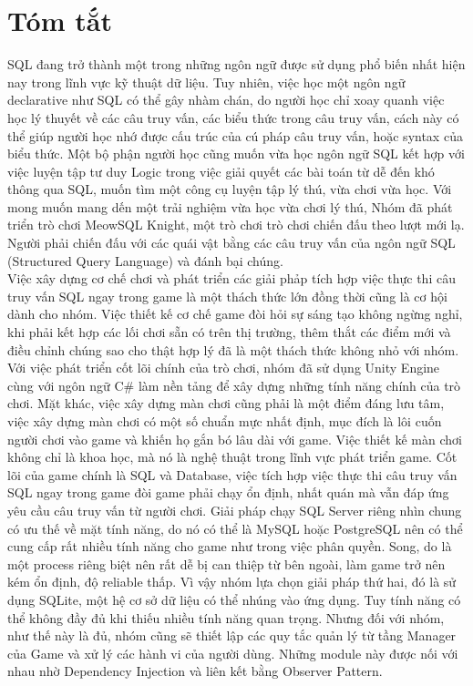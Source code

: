 \section*{Tóm tắt}
\thispagestyle{empty}

\hspace*{0.5cm} SQL đang trở thành một trong những ngôn ngữ được sử dụng phổ biến nhất hiện nay trong lĩnh vực kỹ thuật dữ liệu. Tuy nhiên, việc học một ngôn ngữ declarative như SQL có thể gây nhàm chán, do người học chỉ xoay quanh việc học lý thuyết về các câu truy vấn, các biểu thức trong câu truy vấn, cách này có thể giúp người học nhớ được cấu trúc của cú pháp câu truy vấn, hoặc syntax của biểu thức. Một bộ phận người học cũng muốn vừa học ngôn ngữ SQL kết hợp với việc luyện tập tư duy Logic trong việc giải quyết các bài toán từ dễ đến khó thông qua SQL, muốn tìm một công cụ luyện tập lý thú, vừa chơi vừa học. Với mong muốn mang dến một trải nghiệm vừa học vừa chơi lý thú, Nhóm đã phát triển trò chơi MeowSQL Knight, một trò chơi trò chơi chiến đấu theo lượt mới lạ. Người phải chiến đấu với các quái vật bằng các câu truy vấn của ngôn ngữ SQL (Structured Query Language) và đánh bại chúng. \\
\hspace*{0.5cm} Việc xây dựng cơ chế chơi và phát triển các giải phảp tích hợp việc thực thi câu truy vấn SQL ngay trong game là một thách thức lớn đồng thời cũng là cơ hội dành cho nhóm. Việc thiết kế cơ chế game đòi hỏi sự sáng tạo không ngừng nghỉ, khi phải kết hợp các lối chơi sẵn có trên thị trường, thêm thắt các điểm mới và điều chỉnh chúng sao cho thật hợp lý đã là một thách thức không nhỏ với nhóm. Với việc phát triển cốt lõi chính của trò chơi, nhóm đã sử dụng Unity Engine cùng với ngôn ngữ C\# làm nền tảng để xây dựng những tính năng chính của trò chơi.
\hspace*{0.5cm} Mặt khác, việc xây dựng màn chơi cũng phải là một điểm đáng lưu tâm, việc xây dựng màn chơi có một số chuẩn mực nhất định, mục đích là lôi cuốn người chơi vào game và khiến họ gắn bó lâu dài với game. Việc thiết kế màn chơi không chỉ là khoa học, mà nó là nghệ thuật trong lĩnh vực phát triển game.
\hspace*{1cm} Cốt lõi của game chính là SQL và Database, việc tích hợp việc thực thi câu truy vấn SQL ngay trong game đòi game phải chạy ổn định, nhất quán mà vẫn đáp ứng yêu cầu câu truy vấn từ người chơi. Giải pháp chạy SQL Server riêng nhìn chung có ưu thế về mặt tính năng, do nó có thể là MySQL hoặc PostgreSQL nên có thể cung cấp rất nhiều tính năng cho game như trong việc phân quyền. Song, do là một process riêng biệt nên rất dễ bị can thiệp từ bên ngoài, làm game trở nên kém ổn định, độ reliable thấp. Vì vậy nhóm lựa chọn giải pháp thứ hai, đó là sử dụng SQLite, một hệ cơ sở dữ liệu có thể nhúng vào ứng dụng. Tuy tính năng có thể không đầy đủ khi thiếu nhiều tính năng quan trọng. Nhưng đối với nhóm, như thế này là đủ, nhóm cũng sẽ thiết lập các quy tắc quản lý từ tầng Manager của Game và xử lý các hành vi của người dùng. Những module này được nối với nhau nhờ Dependency Injection và liên kết bằng Observer Pattern.\\
